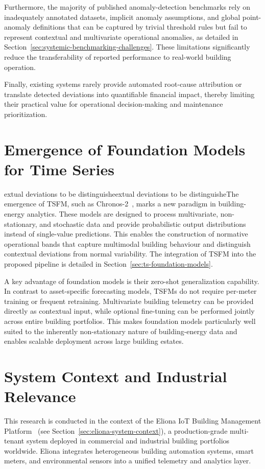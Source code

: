 Furthermore, the majority of published anomaly-detection benchmarks rely on inadequately annotated datasets, implicit anomaly assumptions, and global point-anomaly definitions that can be captured by trivial threshold rules but fail to represent contextual and multivariate operational anomalies, as detailed in Section~\ref{sec:systemic-benchmarking-challenges}. These limitations significantly reduce the transferability of reported performance to real-world building operation.

Finally, existing systems rarely provide automated root-cause attribution or translate detected deviations into quantifiable financial impact, thereby limiting their practical value for operational decision-making and maintenance prioritization.

\section{Emergence of Foundation Models for Time Series}

extual deviations to be distinguisheextual deviations to be distinguisheThe emergence of \ac{TSFM}, such as Chronos-2~\cite{ansari2025chronos}, marks a new paradigm in building-energy analytics. These models are designed to process multivariate, non-stationary, and stochastic data and provide probabilistic output distributions instead of single-value predictions. This enables the construction of normative operational bands that capture multimodal
building behaviour and distinguish contextual deviations from normal variability.
The integration of \ac{TSFM} into the proposed pipeline is detailed in
Section~\ref{sec:ts-foundation-models}.

A key advantage of foundation models is their zero-shot generalization capability. In contrast to asset-specific forecasting models, \ac{TSFM}s do not require per-meter training or frequent retraining. Multivariate building telemetry can be provided directly as contextual input, while optional fine-tuning can be performed jointly across entire building portfolios. This makes foundation models particularly well suited to the inherently non-stationary nature of building-energy data and enables scalable deployment across large building estates.

\section{System Context and Industrial Relevance}

This research is conducted in the context of the Eliona IoT Building Management Platform~\cite{ElionaWebsite} (see Section~\ref{sec:eliona-system-context}), a production-grade multi-tenant system deployed in commercial and industrial building portfolios worldwide. Eliona integrates heterogeneous building automation systems, smart meters, and environmental sensors into a unified telemetry and analytics layer.

